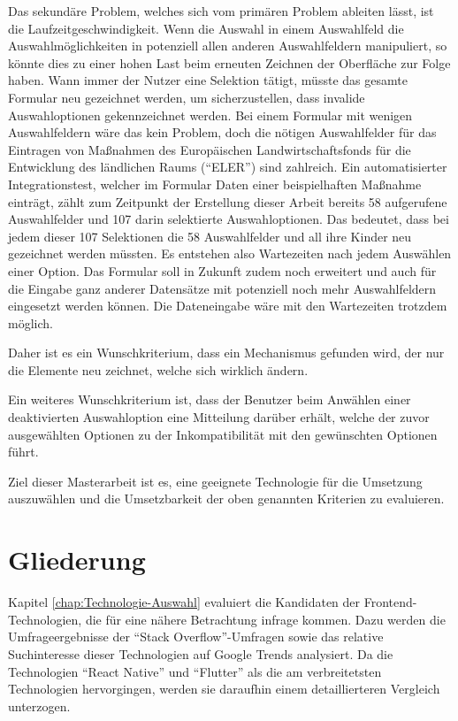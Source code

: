 Das sekundäre Problem,
welches sich vom primären Problem ableiten lässt,
ist die  Laufzeitgeschwindigkeit. 
Wenn die Auswahl in einem Auswahlfeld die Auswahlmöglichkeiten in potenziell allen anderen Auswahlfeldern manipuliert,
so könnte dies zu einer hohen Last beim erneuten Zeichnen der Oberfläche zur Folge haben.
Wann immer der Nutzer eine Selektion tätigt,
müsste das gesamte Formular neu gezeichnet werden,
um sicherzustellen,
dass invalide Auswahloptionen gekennzeichnet werden.
Bei einem  Formular mit wenigen Auswahlfeldern wäre das kein Problem,
doch die nötigen Auswahlfelder für das Eintragen von Maßnahmen des Europäischen Landwirtschaftsfonds für die Entwicklung des ländlichen Raums (\enquote{ELER}) sind zahlreich.
Ein  automatisierter Integrationstest,
welcher im Formular Daten einer beispielhaften Maßnahme einträgt,
zählt zum Zeitpunkt der Erstellung dieser Arbeit bereits 58 aufgerufene Auswahlfelder und 107 darin selektierte Auswahloptionen.
Das bedeutet,
dass bei jedem dieser 107 Selektionen die 58 Auswahlfelder und all ihre Kinder neu gezeichnet werden müssten.
Es entstehen also Wartezeiten nach jedem Auswählen einer Option.
Das Formular soll in Zukunft zudem noch erweitert und auch für die Eingabe ganz anderer Datensätze mit potenziell noch mehr Auswahlfeldern eingesetzt werden können.
Die Dateneingabe wäre mit den Wartezeiten trotzdem möglich.
\begin{newText}Daher ist es ein Wunschkriterium, dass ein Mechanismus gefunden wird,
der nur die Elemente neu zeichnet, welche sich wirklich ändern.\end{newText}

Ein weiteres Wunschkriterium ist,
dass der Benutzer beim Anwählen einer deaktivierten Auswahloption eine Mitteilung darüber erhält,
welche der zuvor ausgewählten Optionen zu der Inkompatibilität mit den gewünschten Optionen führt.

Ziel dieser Masterarbeit ist es, eine geeignete Technologie für die Umsetzung auszuwählen
und die Umsetzbarkeit der  oben genannten Kriterien zu evaluieren.

\section{Gliederung}






Kapitel \ref{chap:Technologie-Auswahl} evaluiert die Kandidaten der Frontend-Technologien,
die für eine nähere Betrachtung infrage kommen.
Dazu werden die Umfrageergebnisse der \enquote{Stack Overflow}-Umfragen sowie das relative Suchinteresse dieser Technologien auf Google Trends analysiert.
Da die Technologien \enquote{React Native} und  \enquote{Flutter} als die am verbreitetsten Technologien hervorgingen,
werden sie daraufhin einem detaillierteren Vergleich unterzogen.

